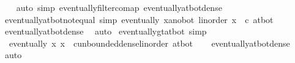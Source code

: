 \begin{isabellebody}
%
\isadelimproof
\ \ %
\endisadelimproof
%
\isatagproof
{}\isamarkupfalse%
\ {\isacharparenleft}{\kern0pt}auto\ simp{\isacharcolon}{\kern0pt}\ eventually{\isacharunderscore}{\kern0pt}filtercomap\ eventually{\isacharunderscore}{\kern0pt}at{\isacharunderscore}{\kern0pt}bot{\isacharunderscore}{\kern0pt}dense{\isacharparenright}{\kern0pt}%
\endisatagproof
{\isafoldproof}%
%
\isadelimproof
\isanewline
%
\endisadelimproof
\isanewline
{}\isamarkupfalse%
\ eventually{\isacharunderscore}{\kern0pt}at{\isacharunderscore}{\kern0pt}bot{\isacharunderscore}{\kern0pt}not{\isacharunderscore}{\kern0pt}equal\ {\isacharbrackleft}{\kern0pt}simp{\isacharbrackright}{\kern0pt}{\isacharcolon}{\kern0pt}\ {\isachardoublequoteopen}eventually\ {\isacharparenleft}{\kern0pt}{\isasymlambda}x{\isacharcolon}{\kern0pt}{\isacharcolon}{\kern0pt}{\isacharprime}{\kern0pt}a{\isacharcolon}{\kern0pt}{\isacharcolon}{\kern0pt}{\isacharbraceleft}{\kern0pt}no{\isacharunderscore}{\kern0pt}bot{\isacharcomma}{\kern0pt}\ linorder{\isacharbraceright}{\kern0pt}{\isachardot}{\kern0pt}\ x\ {\isasymnoteq}\ c{\isacharparenright}{\kern0pt}\ at{\isacharunderscore}{\kern0pt}bot{\isachardoublequoteclose}\isanewline
%
\isadelimproof
\ \ %
\endisadelimproof
%
\isatagproof
{}\isamarkupfalse%
\ eventually{\isacharunderscore}{\kern0pt}at{\isacharunderscore}{\kern0pt}bot{\isacharunderscore}{\kern0pt}dense\ \isamarkupfalse%
\ auto%
\endisatagproof
{\isafoldproof}%
%
\isadelimproof
\isanewline
%
\endisadelimproof
\isanewline
{}\isamarkupfalse%
\ eventually{\isacharunderscore}{\kern0pt}gt{\isacharunderscore}{\kern0pt}at{\isacharunderscore}{\kern0pt}bot\ {\isacharbrackleft}{\kern0pt}simp{\isacharbrackright}{\kern0pt}{\isacharcolon}{\kern0pt}\isanewline
\ \ {\isachardoublequoteopen}eventually\ {\isacharparenleft}{\kern0pt}{\isasymlambda}x{\isachardot}{\kern0pt}\ x\ {\isacharless}{\kern0pt}\ {\isacharparenleft}{\kern0pt}c{\isacharcolon}{\kern0pt}{\isacharcolon}{\kern0pt}{\isacharunderscore}{\kern0pt}{\isacharcolon}{\kern0pt}{\isacharcolon}{\kern0pt}unbounded{\isacharunderscore}{\kern0pt}dense{\isacharunderscore}{\kern0pt}linorder{\isacharparenright}{\kern0pt}{\isacharparenright}{\kern0pt}\ at{\isacharunderscore}{\kern0pt}bot{\isachardoublequoteclose}\isanewline
%
\isadelimproof
\ \ %
\endisadelimproof
%
\isatagproof
{}\isamarkupfalse%
\ eventually{\isacharunderscore}{\kern0pt}at{\isacharunderscore}{\kern0pt}bot{\isacharunderscore}{\kern0pt}dense\ \isamarkupfalse%
\ auto%
\endisatagproof
{\isafoldproof}%
%
\isadelimproof

\end{isabellebody}

